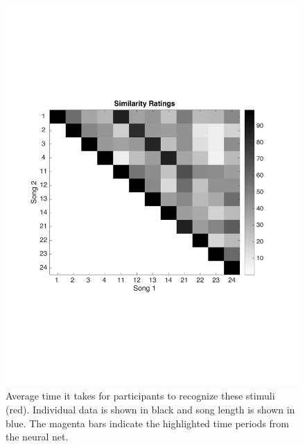 \begin{figure}[h] 
  \begin{center}
    \includegraphics[width=\textwidth,keepaspectratio=true]{Figures/Similarity}
    \caption{Average time it takes for participants to recognize these stimuli (red). Individual data is shown in black and song length is shown in blue. The magenta bars indicate the highlighted time periods from the neural net.}
    \label{fig:Similarity}
  \end{center}
\end{figure}
